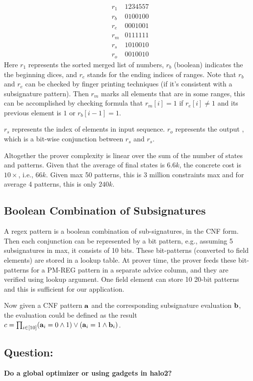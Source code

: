 \begin{eqnarray*}
  &r_1 & 1 2 3 4 5 5 7 \\
  &r_b & 0 1 0 0 1 0 0 \\
  &r_e & 0 0 0 1 0 0 1 \\
  &r_m & 0 1 1 1 1 1 1 \\
  &r_s & 1 0 1 0 0 1 0 \\
  &r_o & 0 0 1 0 0 1 0 
\end{eqnarray*}
Here $r_1$ represents the sorted merged list of numbers,
$r_b$ (boolean) indicates the the beginning dices,
and $r_e$ stands for the ending indices of ranges.
Note that $r_b$ and $r_e$ can be checked by 
finger printing techniques (if it's consistent with
a subsignature pattern).
Then $r_m$ marks all elements that are in some ranges,
this can be accomplished by checking formula that
$r_m[i] = 1$ if $r_e[i] \neq 1$ and its previous element is $1$
or $r_b[i-1] = 1$. 

$r_s$ represents the index of elements in input sequence.
$r_o$ represents the output , which is a bit-wise
conjunction between $r_s$ and $r_s$.

Altogether the prover complexity is linear over the sum of
the number of states and patterns. Given that the average of
final states is $6.6k$, the concrete cost is $10\times$, i.e.,
$66k$. Given max 50 patterns, this is $3$ million constraints max
and for average 4 patterns, this is only $240k$.

\subsection{Boolean Combination of Subsignatures}
A regex pattern is a boolean combination of sub-signatures, in the
CNF form. Then each conjunction can be represented by a bit pattern,
e.g., assuming 5 subsignatures in max, it consists of 10 bits.
These bit-patterns (converted to field elements) are stored in a lookup
table.
At prover time, the prover feeds these bit-patterns for a PM-REG pattern
in a separate advice column, and they are verified using lookup argument.
One field element can store 10 20-bit patterns and this is sufficient
for our application.

Now given a CNF pattern ${{\mathbf {a}}}$ and the corresponding
subsignature evaluation ${{\mathbf {b}}}$, the evaluation could be
defined as the result $c = \prod_{i\in [10]} ({{\mathbf {a}}}_i=0 \wedge 1) \vee
	({{\mathbf {a}}}_i=1 \wedge {{\mathbf {b}}}_i)$.

\subsection{Question:}
{\bf Do a global optimizer or using gadgets in halo2?}



